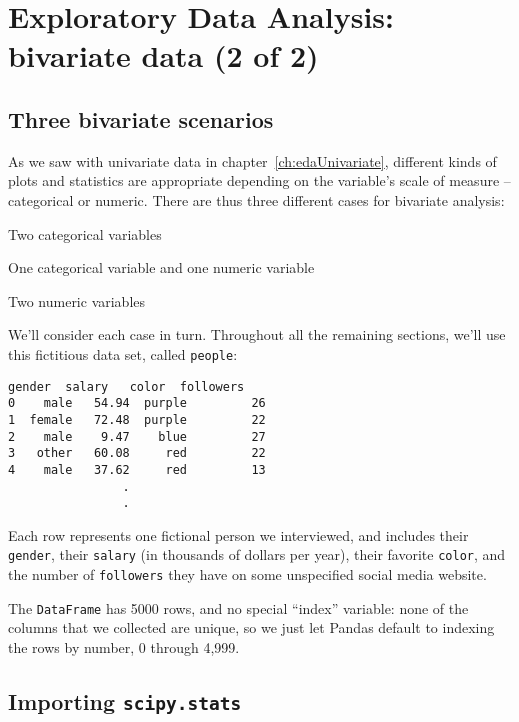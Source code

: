
\chapter{Exploratory Data Analysis: bivariate data (2 of 2)}
\label{ch:edaBivariate2}

\section{Three bivariate scenarios}


As we saw with univariate data in chapter~\ref{ch:edaUnivariate}, different
kinds of plots and statistics are appropriate depending on the variable's scale
of measure -- categorical or numeric. There are thus three different cases for
bivariate analysis:

\begin{compactitem}
\item Two categorical variables
\item One categorical variable and one numeric variable
\item Two numeric variables
\end{compactitem}

We'll consider each case in turn. Throughout all the remaining sections, we'll
use this fictitious data set, called \texttt{people}:

\begin{Verbatim}[fontsize=\small,samepage=true,frame=leftline,framesep=5mm,framerule=1mm]
   gender  salary   color  followers
0    male   54.94  purple         26
1  female   72.48  purple         22
2    male    9.47    blue         27
3   other   60.08     red         22
4    male   37.62     red         13
                .
                .
\end{Verbatim}

Each row represents one fictional person we interviewed, and includes their 
\texttt{gender}, their \texttt{salary} (in thousands of dollars per year),
their favorite \texttt{color}, and the number of \texttt{followers} they have
on some unspecified social media website.

The \texttt{DataFrame} has 5000 rows, and no special ``index'' variable: none
of the columns that we collected are unique, so we just let Pandas default to
indexing the rows by number, 0 through 4,999.

\section{Importing \texttt{scipy.stats}}

